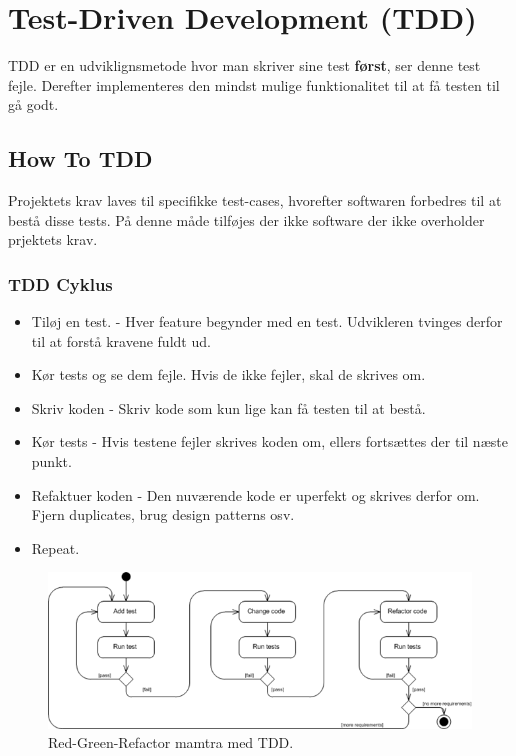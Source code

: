 \section{Test-Driven Development (TDD)}

TDD er en udviklignsmetode hvor man skriver sine test \textbf{først}, ser denne test fejle. Derefter implementeres den mindst mulige funktionalitet til at få testen til gå godt.

\subsection{How To TDD}
Projektets krav laves til specifikke test-cases, hvorefter softwaren forbedres til at bestå disse tests. På denne måde tilføjes der ikke software der ikke overholder prjektets krav.

\subsubsection{TDD Cyklus}
\begin{itemize}
	\item Tiløj en test. - Hver feature begynder med en test. Udvikleren tvinges derfor til at forstå kravene fuldt ud.
	\item Kør tests og se dem fejle. Hvis de ikke fejler, skal de skrives om.
	\item Skriv koden - Skriv kode som kun lige kan få testen til at bestå.
	\item Kør tests - Hvis testene fejler skrives koden om, ellers fortsættes der til næste punkt.
	\item Refaktuer koden - Den nuværende kode er uperfekt og skrives derfor om. Fjern duplicates, brug design patterns osv.
	\item Repeat.
\end{itemize}


\begin{figure}[h]
\centering
\includegraphics[width=\linewidth]{figs/tdd}
\caption{Red-Green-Refactor mamtra med TDD.}
\label{fig:tdd}
\end{figure}

